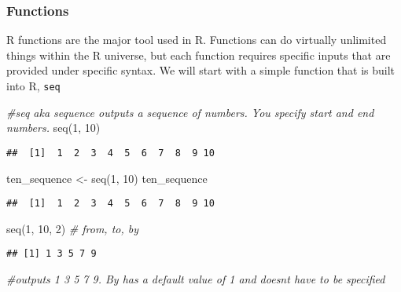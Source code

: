 \documentclass[
]{article}
\newenvironment{Shaded}{\begin{snugshade}}{\end{snugshade}}
\newcommand{\CommentTok}[1]{\textcolor[rgb]{0.56,0.35,0.01}{\textit{#1}}}
\newcommand{\DecValTok}[1]{\textcolor[rgb]{0.00,0.00,0.81}{#1}}
\newcommand{\FunctionTok}[1]{\textcolor[rgb]{0.00,0.00,0.00}{#1}}
\newcommand{\NormalTok}[1]{#1}
\newcommand{\OtherTok}[1]{\textcolor[rgb]{0.56,0.35,0.01}{#1}}
\begin{document}
\hypertarget{functions}{%
\subsubsection{Functions}\label{functions}}

R functions are the major tool used in R. Functions can do virtually
unlimited things within the R universe, but each function requires
specific inputs that are provided under specific syntax. We will start
with a simple function that is built into R, \texttt{seq}

\begin{Shaded}
\begin{Highlighting}[]
\CommentTok{\#seq aka sequence outputs a sequence of numbers. You specify start and end numbers. }
\FunctionTok{seq}\NormalTok{(}\DecValTok{1}\NormalTok{, }\DecValTok{10}\NormalTok{)}
\end{Highlighting}
\end{Shaded}

\begin{verbatim}
##  [1]  1  2  3  4  5  6  7  8  9 10
\end{verbatim}

\begin{Shaded}
\begin{Highlighting}[]
\NormalTok{ten\_sequence }\OtherTok{\textless{}{-}} \FunctionTok{seq}\NormalTok{(}\DecValTok{1}\NormalTok{, }\DecValTok{10}\NormalTok{)}
\NormalTok{ten\_sequence}
\end{Highlighting}
\end{Shaded}

\begin{verbatim}
##  [1]  1  2  3  4  5  6  7  8  9 10
\end{verbatim}

\begin{Shaded}
\begin{Highlighting}[]
\FunctionTok{seq}\NormalTok{(}\DecValTok{1}\NormalTok{, }\DecValTok{10}\NormalTok{, }\DecValTok{2}\NormalTok{) }\CommentTok{\# from, to, by}
\end{Highlighting}
\end{Shaded}

\begin{verbatim}
## [1] 1 3 5 7 9
\end{verbatim}

\begin{Shaded}
\begin{Highlighting}[]
\CommentTok{\#outputs 1 3 5 7 9. By has a default value of 1 and doesn\textquotesingle{}t have to be specified}
\end{Highlighting}
\end{Shaded}
\end{document}
